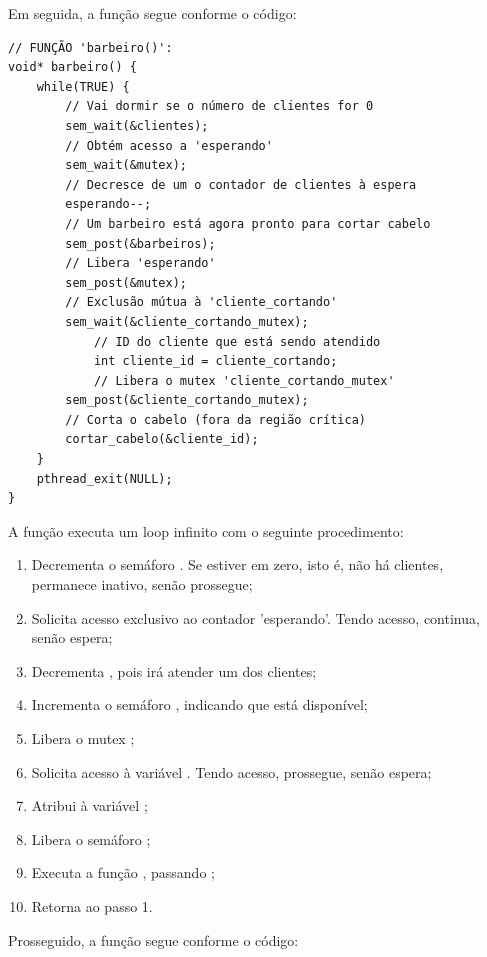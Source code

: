 \documentclass[
	12pt,				%
	openright,			%
	oneside,			%
	a4paper,			%
	chapter=TITLE,		%
	english,			%
	french,				%
	spanish,			%
	brazil				%
	]{abntex2}
\theoremstyle{definition}
\begin{document}
Em seguida, a função  segue conforme o código:

\begin{verbatim}
// FUNÇÃO 'barbeiro()':
void* barbeiro() {
    while(TRUE) {
        // Vai dormir se o número de clientes for 0 
        sem_wait(&clientes);
        // Obtém acesso a 'esperando' 
        sem_wait(&mutex); 
        // Decresce de um o contador de clientes à espera
        esperando--; 
        // Um barbeiro está agora pronto para cortar cabelo 
        sem_post(&barbeiros);
        // Libera 'esperando' 
        sem_post(&mutex);
        // Exclusão mútua à 'cliente_cortando'
        sem_wait(&cliente_cortando_mutex); 
            // ID do cliente que está sendo atendido
            int cliente_id = cliente_cortando;
            // Libera o mutex 'cliente_cortando_mutex'
        sem_post(&cliente_cortando_mutex); 
        // Corta o cabelo (fora da região crítica) 
        cortar_cabelo(&cliente_id);
    }
    pthread_exit(NULL);
}
\end{verbatim}

A função  executa um loop infinito com o seguinte procedimento:

\begin{enumerate}
    \item Decrementa o semáforo . Se estiver em zero, isto é, não há clientes, permanece inativo, senão prossegue;
    \item Solicita acesso exclusivo ao contador 'esperando'. Tendo acesso, continua, senão espera;
    \item Decrementa , pois irá atender um dos clientes;
    \item Incrementa o semáforo , indicando que está disponível;
    \item Libera o mutex ;
    \item Solicita acesso à variável . Tendo acesso, prossegue, senão espera;
    \item Atribui  à variável ;
    \item Libera o semáforo ;
    \item Executa a função , passando ;
    \item Retorna ao passo 1.
\end{enumerate}

Prosseguido, a função  segue conforme o código:
\end{document}
